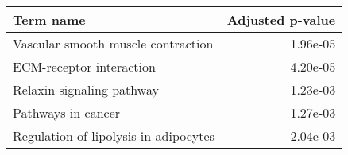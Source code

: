 \begin{tabular}{lr}
\toprule
                             Term name &  Adjusted p-value \\
\midrule
    Vascular smooth muscle contraction &          1.96e-05 \\
              ECM-receptor interaction &          4.20e-05 \\
             Relaxin signaling pathway &          1.23e-03 \\
                    Pathways in cancer &          1.27e-03 \\
 Regulation of lipolysis in adipocytes &          2.04e-03 \\
\bottomrule
\end{tabular}
